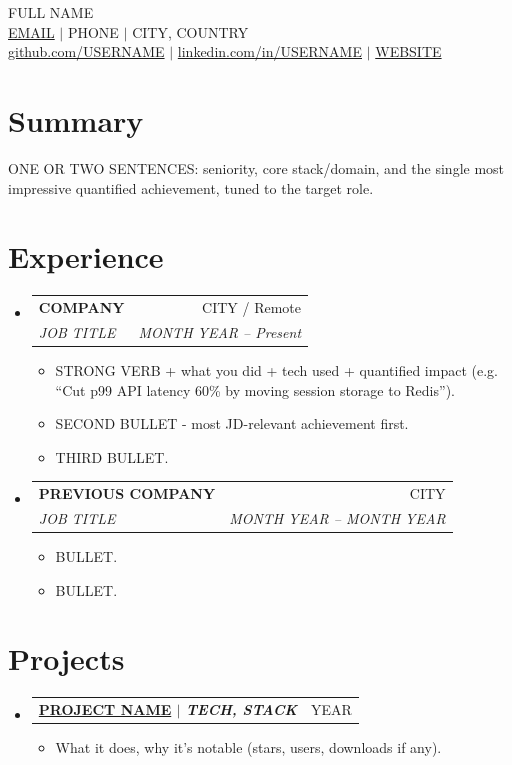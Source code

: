 \documentclass[letterpaper,11pt]{article}
\makeatletter
\newcommand{\resumeItem}[1]{\item\small{#1}\vspace{-2pt}}
\newcommand{\resumeEntry}[4]{
  \vspace{-1pt}\item
    \begin{tabular*}{0.97\textwidth}[t]{l@{\extracolsep{\fill}}r}
      \textbf{#1} & #2 \\
      \textit{\small#3} & \textit{\small #4} \\
    \end{tabular*}\vspace{-6pt}
}
\newcommand{\resumeProjectEntry}[2]{
  \vspace{-1pt}\item
    \begin{tabular*}{0.97\textwidth}[t]{l@{\extracolsep{\fill}}r}
      \small\textbf{#1} & #2 \\
    \end{tabular*}\vspace{-6pt}
}
\newcommand{\resumeEntryStart}{\begin{itemize}[leftmargin=0.0in, label={}]}
\newcommand{\resumeEntryEnd}{\end{itemize}}
\newcommand{\resumeItemStart}{\begin{itemize}[leftmargin=0.15in]}
\newcommand{\resumeItemEnd}{\end{itemize}\vspace{-4pt}}
\makeatother
\begin{document}
\begin{center}
    {\Huge \scshape FULL NAME} \\ \vspace{2pt}
    \small
    \href{mailto:EMAIL}{EMAIL} $|$
    PHONE $|$
    CITY, COUNTRY \\ \vspace{1pt}
    \href{https://github.com/USERNAME}{github.com/USERNAME} $|$
    \href{https://linkedin.com/in/USERNAME}{linkedin.com/in/USERNAME} $|$
    \href{https://WEBSITE}{WEBSITE}
\end{center}

\section{Summary}
\small{ONE OR TWO SENTENCES: seniority, core stack/domain, and the single most
impressive quantified achievement, tuned to the target role.}

\section{Experience}
\resumeEntryStart

  \resumeEntry{COMPANY}{CITY / Remote}{JOB TITLE}{MONTH YEAR -- Present}
  \resumeItemStart
    \resumeItem{STRONG VERB + what you did + tech used + quantified impact
      (e.g. ``Cut p99 API latency 60\% by moving session storage to Redis'').}
    \resumeItem{SECOND BULLET - most JD-relevant achievement first.}
    \resumeItem{THIRD BULLET.}
  \resumeItemEnd

  \resumeEntry{PREVIOUS COMPANY}{CITY}{JOB TITLE}{MONTH YEAR -- MONTH YEAR}
  \resumeItemStart
    \resumeItem{BULLET.}
    \resumeItem{BULLET.}
  \resumeItemEnd

\resumeEntryEnd

\section{Projects}
\resumeEntryStart

  \resumeProjectEntry{\href{https://github.com/USERNAME/PROJECT}{PROJECT NAME} $|$ \emph{TECH, STACK}}{YEAR}
  \resumeItemStart
    \resumeItem{What it does, why it's notable (stars, users, downloads if any).}
  \resumeItemEnd

\resumeEntryEnd
\end{document}
